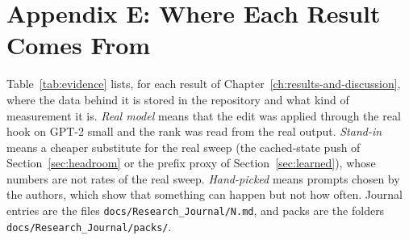 \documentclass[12pt,a4paper]{report}
\begin{document}
\section*{Appendix E: Where Each Result Comes From}
\setcounter{table}{0}
Table~\ref{tab:evidence} lists, for each result of Chapter~\ref{ch:results-and-discussion}, where the data behind it is stored in the repository and what kind of measurement it is. \textit{Real model} means that the edit was applied through the real hook on GPT-2 small and the rank was read from the real output. \textit{Stand-in} means a cheaper substitute for the real sweep (the cached-state push of Section~\ref{sec:headroom} or the prefix proxy of Section~\ref{sec:learned}), whose numbers are not rates of the real sweep. \textit{Hand-picked} means prompts chosen by the authors, which show that something can happen but not how often. Journal entries are the files \texttt{docs/\allowbreak{}Research\_\allowbreak{}Journal/\allowbreak{}N.\allowbreak{}md}, and packs are the folders \texttt{docs/\allowbreak{}Research\_\allowbreak{}Journal/\allowbreak{}packs/\allowbreak{}}.
\end{document}
